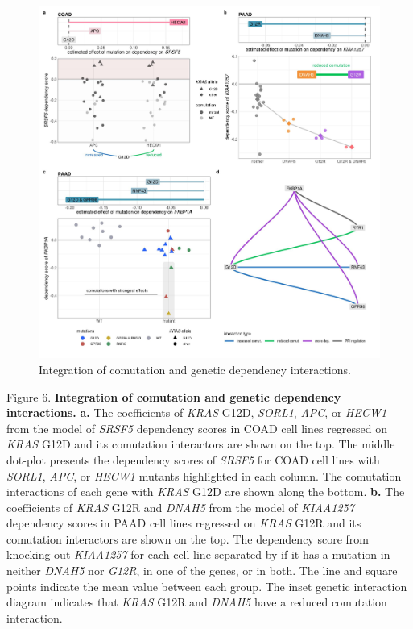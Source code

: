 \documentclass[english, 10pt, letterpaper]{article}
\newcommand{\KRAS}{\emph{KRAS}}
\begin{document}
\begin{figure}[h!]
\centering
\includegraphics[width=180mm]{figures/Fig_6.jpeg}
\caption{Integration of comutation and genetic dependency interactions.}
\label{fig:dep-map-comut-adding}
\end{figure}
\newpage
\noindent Figure 6. \textbf{Integration of comutation and genetic dependency interactions.}
\textbf{a.} The coefficients of \KRAS{} G12D, \emph{SORL1}, \emph{APC}, or \emph{HECW1} from the model of \emph{SRSF5} dependency scores in COAD cell lines regressed on \KRAS{} G12D and its comutation interactors are shown on the top. The middle dot-plot presents the dependency scores of \emph{SRSF5} for COAD cell lines with \emph{SORL1}, \emph{APC}, or \emph{HECW1} mutants highlighted in each column. The comutation interactions of each gene with \KRAS{} G12D are shown along the bottom.
\textbf{b.} The coefficients of \KRAS{} G12R and \emph{DNAH5} from the model of \emph{KIAA1257} dependency scores in PAAD cell lines regressed on \KRAS{} G12R and its comutation interactors are shown on the top. The dependency score from knocking-out \emph{KIAA1257} for each cell line separated by if it has a mutation in neither \emph{DNAH5} nor \emph{G12R}, in one of the genes, or in both. The line and square points indicate the mean value between each group. The inset genetic interaction diagram indicates that \KRAS{} G12R and \emph{DNAH5} have a reduced comutation interaction.
\end{document}

